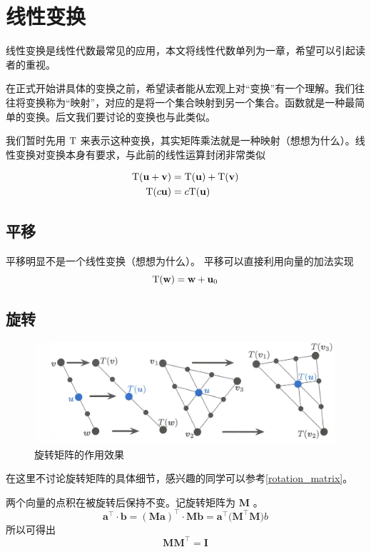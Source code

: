 \chapter{线性变换}

线性变换是线性代数最常见的应用，本文将线性代数单列为一章，希望可以引起读者的重视。

在正式开始讲具体的变换之前，希望读者能从宏观上对“变换”有一个理解。我们往往将变换称为“映射”，对应的是将一个集合映射到另一个集合。函数就是一种最简单的变换。后文我们要讨论的变换也与此类似。

我们暂时先用 $\text T$ 来表示这种变换，其实矩阵乘法就是一种映射（想想为什么）。线性变换对变换本身有要求，与此前的线性运算封闭非常类似

$$
\begin{aligned}
	\text T(\mathbf u+\mathbf v) &= \text T(\mathbf u)+\text T(\mathbf v)\\
	\text T(c\mathbf u) &=c\text T(\mathbf u)
\end{aligned}
$$

\section{平移}

平移明显不是一个线性变换（想想为什么）。
平移可以直接利用向量的加法实现
$$
\text T(\mathbf w)=\mathbf w+\mathbf u_0
$$

\section{旋转}

\begin{figure}[h]
	\centering
	\includegraphics[width=0.7\linewidth]{"../img/Pasted image 20231015162403"}
	\caption{旋转矩阵的作用效果}
	\label{image_rotation}
\end{figure}

在这里不讨论旋转矩阵的具体细节，感兴趣的同学可以参考\ref{rotation_matrix}。

两个向量的点积在被旋转后保持不变。记旋转矩阵为 $\mathbf M$ 。
$$
\mathbf a^\top\cdot\mathbf b = (\mathbf M\mathbf a)^\top\cdot\mathbf M\mathbf b=\mathbf a^\top(\mathbf M^\top \mathbf M\mathbf) b 
$$
所以可得出
$$
\mathbf M\mathbf M^\top=\mathbf I 
$$



